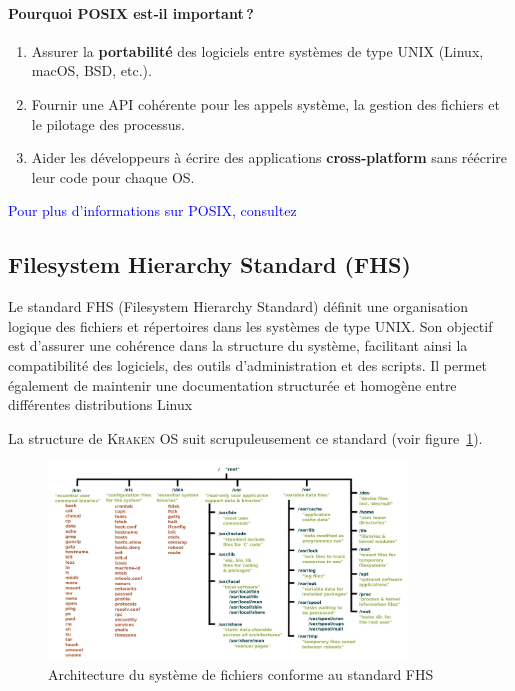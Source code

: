 \paragraph{Pourquoi POSIX est‑il important ?}
\begin{enumerate}
  \item Assurer la \textbf{portabilité} des logiciels entre systèmes de type UNIX (Linux, macOS, BSD, etc.).
  \item Fournir une API cohérente pour les appels système, la gestion des fichiers et le pilotage des processus.
  \item Aider les développeurs à écrire des applications \textbf{cross‑platform} sans réécrire leur code pour chaque OS.
\end{enumerate}


\textcolor{blue}{Pour plus d’informations sur POSIX, consultez \cite{posix}}

\subsection{Filesystem Hierarchy Standard (FHS) }
\label{sssec:fhs}
Le standard FHS (Filesystem Hierarchy Standard) définit une organisation logique des fichiers et répertoires dans les systèmes de type UNIX. Son objectif est d’assurer une cohérence dans la structure du système, facilitant ainsi la compatibilité des logiciels, des outils d’administration et des scripts. Il permet également de maintenir une documentation structurée et homogène entre différentes distributions Linux 



La structure de \textsc{Kraken OS} suit scrupuleusement ce standard (voir figure\textcolor{blue}{~\ref{fig:fsl}}).

\begin{figure}[H]
  \centering
  \includegraphics[width=0.85\textwidth]{images_pfe/fslinux.png}
  \caption{Architecture du système de fichiers conforme au standard FHS }
  \label{fig:fsl}
\end{figure}




